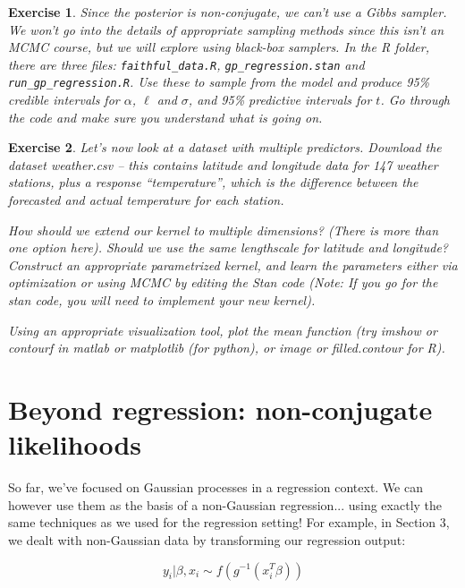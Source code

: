 \documentclass[twoside]{article}
\newcounter{lecnum}
\newtheorem{exercise}{Exercise}[lecnum]
\begin{document}
 \begin{exercise}
   Since the posterior is non-conjugate, we can't use a Gibbs sampler. We won't go into the details of appropriate sampling methods since this isn't an MCMC course, but we will explore using black-box samplers. In the R folder, there are three files: \texttt{faithful\_data.R}, \texttt{gp\_regression.stan} and \texttt{run\_gp\_regression.R}. Use these to sample from the model and produce 95\% credible intervals for $\alpha$, $\ell$ and $\sigma$, and 95\% predictive intervals for $t$. Go through the code and make sure you understand what is going on.

 \end{exercise}


 \begin{exercise}
   Let's now look at a dataset with multiple predictors. Download the dataset weather.csv -- this contains latitude and longitude data for 147 weather stations, plus a response ``temperature'', which is the difference between the forecasted and actual temperature for each station.

   How should we extend our kernel to multiple dimensions? (There is more than one option here). Should we use the same lengthscale for latitude and longitude?  Construct an appropriate parametrized kernel, and learn the parameters either via optimization or using MCMC by editing the Stan code (Note: If you go for the stan code, you will need to implement your new kernel).

   Using an appropriate visualization tool, plot the mean function (try imshow or contourf in matlab or matplotlib (for python), or image or filled.contour for R).
 \end{exercise}



   


 
 \section{Beyond regression: non-conjugate likelihoods}

 So far, we've focused on Gaussian processes in a regression context. We can however use them as the basis of a non-Gaussian regression... using exactly the same techniques as we used for the regression setting! For example, in Section 3, we dealt with non-Gaussian data by transforming our regression output:

 $$y_i|\beta,x_i \sim f(g^{-1}(x_i^T\beta))$$
\end{document}
